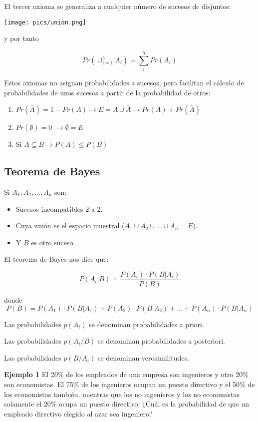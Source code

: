 \documentclass[]{article}
\numberwithin{equation}{section}
\begin{document}
El tercer axioma se generaliza a cualquier número de sucesos de
disjuntos:

\texttt{[image: pics/union.png]}

y por tanto

\[
  Pr\left( \cup_{i=1}^{5}A_i\right) = \sum_{i}^5 Pr(A_i)
 \]

Estos axiomas no asignan probabilidades a sucesos, pero facilitan el
cálculo de probabilidades de unos sucesos a partir de la probabilidad de
otros:

\begin{enumerate}
\def\labelenumi{\arabic{enumi}.}
\item
  \(Pr(\bar{A}) = 1-Pr(A) \rightarrow E = A \cup \bar{A} \rightarrow Pr(A) + Pr(\bar{A})\)
\item
  \(Pr(\emptyset) = 0\) \(\rightarrow \emptyset = E\)
\item
  Si \(A \subseteq B \rightarrow P(A) \leq P(B)\)
\end{enumerate}

\subsection{Teorema de Bayes}\label{teorema-de-bayes}

Si \(A_1, A_2 ,... , A_n\) son:

\begin{itemize}
\item
  Sucesos incompatibles 2 a 2.
\item
  Cuya unión es el espacio muestral
  (\(A_1 \cup A_2 \cup... \cup A_n = E\)).
\item
  Y \(B\) es otro suceso.
\end{itemize}

El teorema de Bayes nos dice que:

\[
P(A_i|B)  = \frac{P(A_i) \cdot P(B|A_i)}{P(B)}
\]

donde \[
 P(B) = P(A_1) \cdot P(B|A_1) + P(A_2) \cdot P(B|A_2) + ... +P(A_n) \cdot P(B|A_n)
\]

Las probabilidades \(p(A_i)\) se denominan probabilidades a priori.

Las probabilidades \(p(A_i/B)\) se denominan probabilidades a
posteriori.

Las probabilidades \(p(B/A_i)\) se denominan verosimilitudes.

\medskip

\textbf{Ejemplo 1} El 20\% de los empleados de una empresa son
ingenieros y otro 20\% son economistas. El 75\% de los ingenieros ocupan
un puesto directivo y el 50\% de los economistas también, mientras que
los no ingenieros y los no economistas solamente el 20\% ocupa un puesto
directivo. ¿Cuál es la probabilidad de que un empleado directivo elegido
al azar sea ingeniero?
\end{document}
